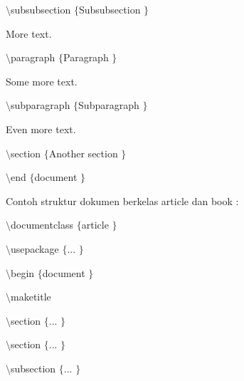  \par
\vspace{12pt}
 $  \setminus  $subsubsection $  \{  $Subsubsection $  \}  $
 \par
\vspace{12pt}
More text.
 \par
\vspace{12pt}
 $  \setminus  $paragraph $  \{  $Paragraph $  \}  $
 \par
\vspace{12pt}
Some more text.
 \par
\vspace{12pt}
 $  \setminus  $subparagraph $  \{  $Subparagraph $  \}  $
 \par
\vspace{12pt}
Even more text.
 \par
\vspace{12pt}
 $  \setminus  $section $  \{  $Another section $  \}  $
 \par
\vspace{12pt}
 $  \setminus  $end $  \{  $document $  \}  $
 \par
\vspace{12pt}
\vspace{12pt}
Contoh struktur dokumen berkelas article dan book :
 \par
{\fontsize{10pt}{10pt}\selectfont  $  \setminus  $documentclass $  \{  $article $  \}  $}
 \par
\vspace{10pt}
{\fontsize{10pt}{10pt}\selectfont  $  \setminus  $usepackage $  \{  $... $  \}  $}
 \par
\vspace{10pt}
{\fontsize{10pt}{10pt}\selectfont  $  \setminus  $begin $  \{  $document $  \}  $}
 \par
\vspace{10pt}
{\fontsize{10pt}{10pt}\selectfont  $  \setminus  $maketitle}
 \par
\vspace{10pt}
{\fontsize{10pt}{10pt}\selectfont  $  \setminus  $section $  \{  $... $  \}  $}
 \par
\vspace{10pt}
{\fontsize{10pt}{10pt}\selectfont  $  \setminus  $section $  \{  $... $  \}  $}
 \par
\vspace{10pt}
{\fontsize{10pt}{10pt}\selectfont  $  \setminus  $subsection $  \{  $... $  \}  $}
 \par
\vspace{10pt}
